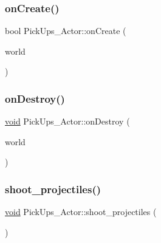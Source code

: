 \subsubsection{\texorpdfstring{on\+Create()}{onCreate()}}
{\footnotesize\ttfamily bool Pick\+Ups\+\_\+\+Actor\+::on\+Create (\begin{DoxyParamCaption}\item[{b2\+World \&}]{world }\end{DoxyParamCaption})}

\mbox{\label{classPickUps__Actor_a0b159c7f94f6a36497a350924dd41e73}} 
\subsubsection{\texorpdfstring{on\+Destroy()}{onDestroy()}}
{\footnotesize\ttfamily \hyperlink{imgui__impl__opengl3__loader_8h_ac668e7cffd9e2e9cfee428b9b2f34fa7}{void} Pick\+Ups\+\_\+\+Actor\+::on\+Destroy (\begin{DoxyParamCaption}\item[{b2\+World \&}]{world }\end{DoxyParamCaption})}

\mbox{\label{classPickUps__Actor_ae4e6ac905806ed9416438afd91b7f4fc}} 
\subsubsection{\texorpdfstring{shoot\+\_\+projectiles()}{shoot\_projectiles()}}
{\footnotesize\ttfamily \hyperlink{imgui__impl__opengl3__loader_8h_ac668e7cffd9e2e9cfee428b9b2f34fa7}{void} Pick\+Ups\+\_\+\+Actor\+::shoot\+\_\+projectiles (\begin{DoxyParamCaption}{ }\end{DoxyParamCaption})}

\mbox{\label{classPickUps__Actor_a3f098ecced007eaa97719faaf7ba35d4}} 
